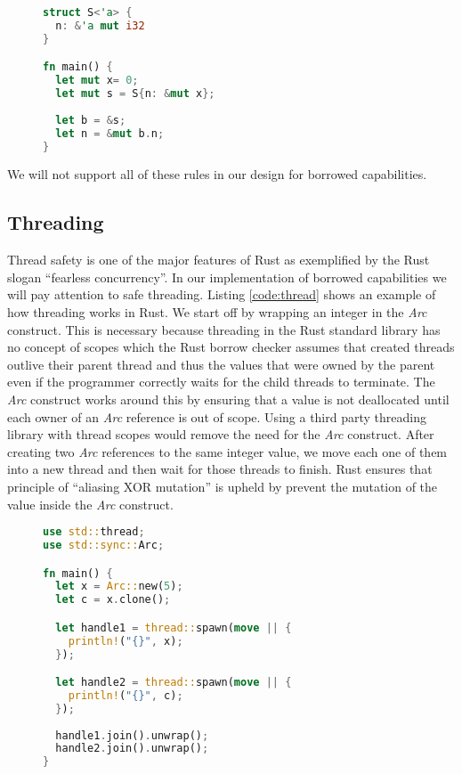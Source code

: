 \begin{figure}[h]
\begin{lstlisting}[language=Rust,frame=single,caption=Mutable reference through shared borrow,label=code:nested_immutmut]
struct S<'a> {
  n: &'a mut i32
}

fn main() {
  let mut x= 0;
  let mut s = S{n: &mut x};
    
  let b = &s;
  let n = &mut b.n;
}
\end{lstlisting}
\end{figure}

We will not support all of these rules in our design for borrowed capabilities.

\subsection{Threading}
Thread safety is one of the major features of Rust as exemplified by the Rust slogan ``fearless concurrency''.
In our implementation of borrowed capabilities we will pay attention to safe threading.
Listing \ref{code:thread} shows an example of how threading works in Rust.
We start off by wrapping an integer in the \textit{Arc} construct.
This is necessary because threading in the Rust standard library has no concept of scopes which the Rust borrow checker assumes that created threads outlive their parent thread and thus the values that were owned by the parent even if the programmer correctly waits for the child threads to terminate.
The \textit{Arc} construct works around this by ensuring that a value is not deallocated until each owner of an \textit{Arc} reference is out of scope.
Using a third party threading library with thread scopes would remove the need for the \textit{Arc} construct.
After creating two \textit{Arc} references to the same integer value, we move each one of them into a new thread and then wait for those threads to finish.
Rust ensures that principle of ``aliasing XOR mutation'' is upheld by prevent the mutation of the value inside the \textit{Arc} construct.

\begin{figure}[h]
\begin{lstlisting}[language=Rust,frame=single,caption=Threading in Rust,label=code:thread]
use std::thread;
use std::sync::Arc;

fn main() {
  let x = Arc::new(5);
  let c = x.clone();

  let handle1 = thread::spawn(move || {
    println!("{}", x);
  });

  let handle2 = thread::spawn(move || {
    println!("{}", c);
  });
  
  handle1.join().unwrap();
  handle2.join().unwrap();
}
\end{lstlisting}
\end{figure}

